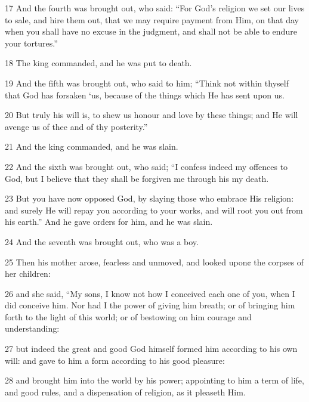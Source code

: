 \par 17 And the fourth was brought out, who said: “For God’s religion we set our lives to sale, and hire them out, that we may require payment from Him, on that day when you shall have no excuse in the judgment, and shall not be able to endure your tortures.” 

\par 18 The king commanded, and he was put to death. 

\par 19 And the fifth was brought out, who said to him; “Think not within thyself that God has forsaken ‘us, because of the things which He has sent upon us. 

\par 20 But truly his will is, to shew us honour and love by these things; and He will avenge us of thee and of thy posterity.” 

\par 21 And the king commanded, and he was slain. 

\par 22 And the sixth was brought out, who said; “I confess indeed my offences to God, but I believe that they shall be forgiven me through his my death. 

\par 23 But you have now opposed God, by slaying those who embrace His religion: and surely He will repay you according to your works, and will root you out from his earth.” And he gave orders for him, and he was slain. 

\par 24 And the seventh was brought out, who was a boy. 

\par 25 Then his mother arose, fearless and unmoved, and looked upon¢ the corpses of her children: 

\par 26 and she said, “My sons, I know not how I conceived each one of you, when I did conceive him. Nor had I the power of giving him breath; or of bringing him forth to the light of this world; or of bestowing on him courage and understanding: 

\par 27 but indeed the great and good God himself formed him according to his own will: and gave to him a form according to his good pleasure: 

\par 28 and brought him into the world by his power; appointing to him a term of life, and good rules, and a dispensation of religion, as it pleaseth Him. 

